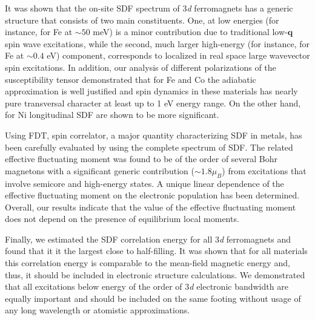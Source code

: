 It was shown that the on-site SDF spectrum of 3\emph{d} ferromagnets has a generic structure that consists of two main constituents. One, at low energies (for instance, for Fe at $\sim 50$ meV) is a minor contribution due to traditional low-$\mathbf{q}$ spin wave excitations, while the second, much larger high-energy (for instance, for Fe at $\sim 0.4$ eV) component, corresponds to localized in real space large wavevector spin excitations. In addition, our analysis of different polarizations of the susceptibility tensor demonstrated that for Fe and Co the adiabatic approximation is well justified and spin dynamics in these materials has nearly pure transversal character at least up to 1 eV energy range. On the other hand, for Ni longitudinal SDF are shown to be more significant.

Using FDT, spin correlator, a major quantity characterizing SDF in metals, has been carefully evaluated by using the complete spectrum of SDF. The related effective fluctuating moment was found to be of the order of several Bohr magnetons with a significant generic contribution ($\sim 1.8\mu_B$) from excitations that involve semicore and high-energy states. A unique linear dependence of the effective fluctuating moment on the electronic population has been determined. Overall, our results indicate that the value of the effective fluctuating moment does not depend on the presence of equilibrium local moments.

Finally, we estimated the SDF correlation energy for all 3\emph{d} ferromagnets and found that it it the largest close to half-filling. It was shown that for all materials this correlation energy is comparable to the mean-field magnetic energy and, thus, it should be included in electronic structure calculations. We demonstrated that all excitations below energy of the order of 3\emph{d} electronic bandwidth are equally important and should be included on the same footing without usage of any long wavelength or atomistic approximations.










